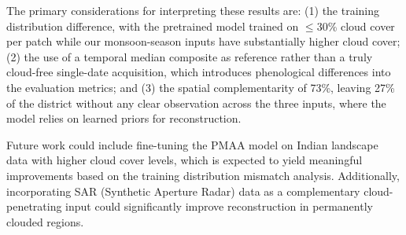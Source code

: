 \documentclass[12pt,a4paper]{article}
\begin{document}
The primary considerations for interpreting these results are: (1) the training distribution difference, with the pretrained model trained on $\leq$30\% cloud cover per patch while our monsoon-season inputs have substantially higher cloud cover; (2) the use of a temporal median composite as reference rather than a truly cloud-free single-date acquisition, which introduces phenological differences into the evaluation metrics; and (3) the spatial complementarity of 73\%, leaving 27\% of the district without any clear observation across the three inputs, where the model relies on learned priors for reconstruction.

Future work could include fine-tuning the PMAA model on Indian landscape data with higher cloud cover levels, which is expected to yield meaningful improvements based on the training distribution mismatch analysis. Additionally, incorporating SAR (Synthetic Aperture Radar) data as a complementary cloud-penetrating input could significantly improve reconstruction in permanently clouded regions.


\end{document}
